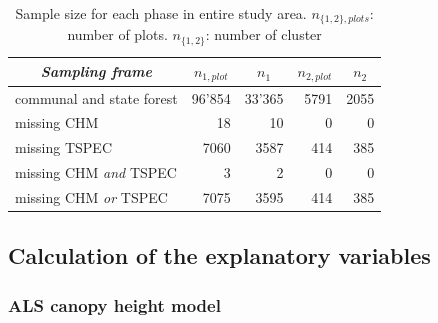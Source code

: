 \begin{table}[H]
	\begin{center}
		\caption{Sample size for each phase in entire study area. $n_{\{1,2\},plots}$: number of plots. $n_{\{1,2\}}$: number of cluster}
		\vspace{0.2cm}
		\label{tab:ssize}
		{\small %
			\begin{tabular}{l|r|r|r|r}
				\hline
				\multicolumn{1}{c|}{\textit{Sampling frame}} & \multicolumn{1}{c|}{\textbf{$n_{1,plot}$}}  & \multicolumn{1}{c|}{\textbf{$n_1$}}  & \multicolumn{1}{c|}{\textbf{$n_{2,plot}$}}  & \multicolumn{1}{c}{\textbf{$n_2$}} \\ %
				\hline \hline
				communal and state forest & 96'854 & 33'365 & 5791 & 2055\\
				\hspace{5mm} \footnotesize missing CHM & \footnotesize 18 & \footnotesize 10 & \footnotesize 0 & \footnotesize 0\\ %
				\hspace{5mm} \footnotesize missing TSPEC & \footnotesize 7060  & \footnotesize 3587 & \footnotesize 414 & \footnotesize 385\\ %
				\hspace{5mm} \footnotesize missing CHM \textit{and} TSPEC & \footnotesize 3 & \footnotesize 2 & \footnotesize 0 & \footnotesize 0\\ %
				\hspace{5mm} \footnotesize missing CHM \textit{or} TSPEC & \footnotesize 7075 & \footnotesize 3595 & \footnotesize 414 & \footnotesize 385\\ %
				\hline \hline
			\end{tabular}
		} %
	\end{center}
\end{table}


\subsection{Calculation of the explanatory variables}
\label{sec:expvarcalc}

\subsubsection{ALS canopy height model}

